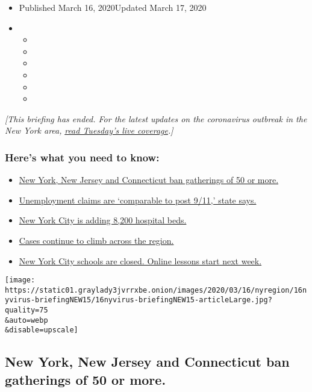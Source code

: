 \begin{itemize}
\item
  Published March 16, 2020Updated March 17, 2020
\item
  \begin{itemize}
  \item
  \item
  \item
  \item
  \item
  \item
  \end{itemize}
\end{itemize}

\emph{{[}This briefing has ended. For the latest updates on the
coronavirus outbreak in the New York area,}
\href{https://www.nytimes3xbfgragh.onion/2020/03/17/nyregion/coronavirus-new-york-update.html}{\emph{read
Tuesday's live coverage}}\emph{.{]}}

\hypertarget{heres-what-you-need-to-know}{%
\subsubsection{Here's what you need to
know:}\label{heres-what-you-need-to-know}}

\begin{itemize}
\tightlist
\item
  \protect\hyperlink{link-13ae310a}{New York, New Jersey and Connecticut
  ban gatherings of 50 or more.}
\item
  \protect\hyperlink{link-1c0b3898}{Unemployment claims are `comparable
  to post 9/11,' state says.}
\item
  \protect\hyperlink{link-6934947d}{New York City is adding 8,200
  hospital beds.}
\item
  \protect\hyperlink{link-1faf6e73}{Cases continue to climb across the
  region.}
\item
  \protect\hyperlink{link-749c668e}{New York City schools are closed.
  Online lessons start next week.}
\end{itemize}

\texttt{[image: https://static01.graylady3jvrrxbe.onion/images/2020/03/16/nyregion/16nyvirus-briefingNEW15/16nyvirus-briefingNEW15-articleLarge.jpg?quality=75\\\&auto=webp\\\&disable=upscale]}

\hypertarget{new-york-new-jersey-and-connecticut-ban-gatherings-of-50-or-more}{%
\subsection{New York, New Jersey and Connecticut ban gatherings of 50 or
more.}\label{new-york-new-jersey-and-connecticut-ban-gatherings-of-50-or-more}}

